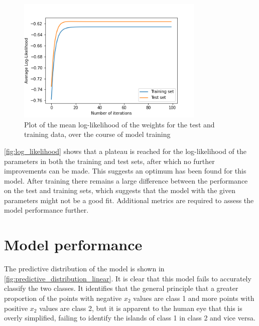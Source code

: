 \documentclass[a4paper]{article}
\begin{document}
    \begin{figure}[h]
        \label{fig:log_likelihood}
        \centering
        \includegraphics[width=0.8\textwidth]{plots/log_likelihood.png}
        \caption{Plot of the mean log-likelihood of the weights for the test and training data, over the
        course of model training}
    \end{figure}

    \autoref{fig:log_likelihood} shows that a plateau is reached for the log-likelihood of the parameters in both the
    training and test sets, after which no further improvements can be made. This suggests an optimum has been found for
    this model. After training there remains a large difference between the performance on the test and
    training sets, which suggests that the model with the given parameters might not be a good fit. Additional metrics
    are required to assess the model performance further.

    \section{Model performance}
    The predictive distribution of the model is shown in \autoref{fig:predictive_distribution_linear}. It is clear that
    this model fails to accurately classify the two classes. It identifies that the general principle that a greater
    proportion of the points with negative $x_2$ values are class 1 and more points with positive $x_2$ values are class
    2, but it is apparent to the human eye that this is overly simplified, failing to identify the islands of class 1 in
    class 2 and vice versa.
\end{document}
